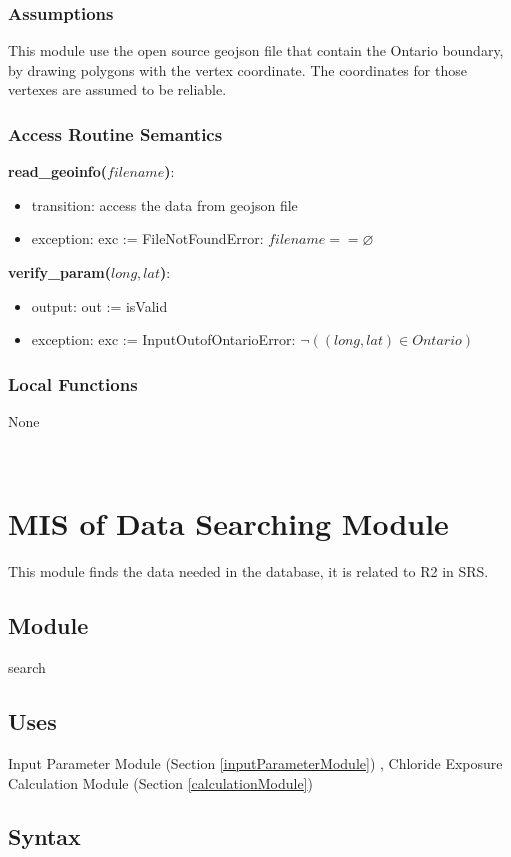 \documentclass[12pt, titlepage]{article}
\begin{document}
\subsubsection{Assumptions}
This module use the open source geojson file that contain the Ontario boundary, by drawing polygons with the vertex coordinate. The coordinates for those vertexes are assumed to be reliable.

\subsubsection{Access Routine Semantics}
\noindent \textbf{read\_geoinfo($filename$)}:
\begin{itemize}
\item transition: access the data from geojson file
\item exception: exc := FileNotFoundError: $filename == \varnothing$
\end{itemize}
\noindent \textbf{verify\_param($long, lat$)}:
\begin{itemize}
\item output: out := isValid
\item exception: exc := InputOutofOntarioError: $\lnot ((long, lat) \in Ontario)$
\end{itemize}

\subsubsection{Local Functions}
None
  
~\newpage

\section{MIS of Data Searching Module} \label{dataSearchingModule} 
This module finds the data needed in the database, it is related to R2 in SRS.
\subsection{Module}

search

\subsection{Uses}
 Input Parameter Module (Section \ref{inputParameterModule})
, Chloride Exposure Calculation Module (Section \ref{calculationModule})


\subsection{Syntax}
\end{document}
